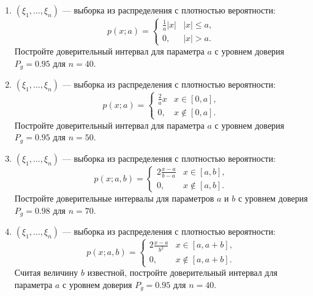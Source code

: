 \documentclass[a4paper,12pt]{article}
\newcommand{\modulus}[1]{\left | #1 \right |}
\newcommand{\sample}[2]{\left( #1_1, \dots, #1_{#2} \right)}
\begin{document}
\begin{enumerate}[topsep=1cm, parsep=1cm, resume]
        \item $\sample{\xi}{n}$ --- выборка из распределения с плотностью вероятности:
              \[
                  p(x; a)
                  = \left \{
                  \begin{array}{ll}
                      \frac{1}{a} \modulus{x} & \modulus{x} \le a , \\
                      0,                      & \modulus{x} > a .
                  \end{array}
                  \right .
              \]
              Постройте доверительный интервал для параметра $a$ с уровнем доверия $P_g = 0.95$ для $n = 40$.

        \item $\sample{\xi}{n}$ --- выборка из распределения с плотностью вероятности:
              \[
                  p(x; a)
                  = \left \{
                  \begin{array}{ll}
                      \frac{2}{a} x & x \in [0, a],     \\
                      0,            & x \notin [0, a] .
                  \end{array}
                  \right .
              \]
              Постройте доверительный интервал для параметра $a$ с уровнем доверия $P_g = 0.95$ для $n = 50$.

        \item $\sample{\xi}{n}$ --- выборка из распределения с плотностью вероятности:
              \[
                  p(x; a, b)
                  = \left \{
                  \begin{array}{ll}
                      2 \frac{x-a}{b-a} & x \in [a, b],     \\
                      0,                & x \notin [a, b] .
                  \end{array}
                  \right .
              \]
              Постройте доверительные интервалы для параметров $a$ и $b$ с уровнем доверия $P_g = 0.98$ для $n = 70$.

        \item $\sample{\xi}{n}$ --- выборка из распределения с плотностью вероятности:
              \[
                  p(x; a, b)
                  = \left \{
                  \begin{array}{ll}
                      2 \frac{x-a}{b^2} & x \in [a, a + b],     \\
                      0,                & x \notin [a, a + b] .
                  \end{array}
                  \right .
              \]
              Считая величину $b$ известной, постройте доверительный интервал для параметра $a$ с уровнем доверия $P_g = 0.95$ для $n = 40$.


\end{enumerate}
\end{document}
